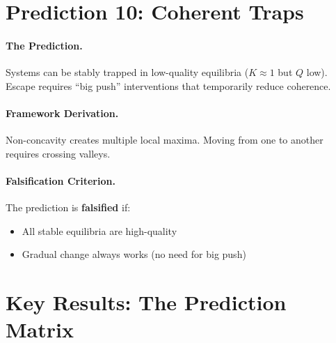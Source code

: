 \section{Prediction 10: Coherent Traps}
\label{sec:S-prediction10}

\paragraph{The Prediction.}
Systems can be stably trapped in low-quality equilibria ($K \approx 1$ but $Q$ low). Escape requires ``big push'' interventions that temporarily reduce coherence.

\paragraph{Framework Derivation.}
Non-concavity creates multiple local maxima. Moving from one to another requires crossing valleys.

\paragraph{Falsification Criterion.}
The prediction is \textbf{falsified} if:
\begin{itemize}
    \item All stable equilibria are high-quality
    \item Gradual change always works (no need for big push)
\end{itemize}


\section{Key Results: The Prediction Matrix}
\label{sec:S-results}

